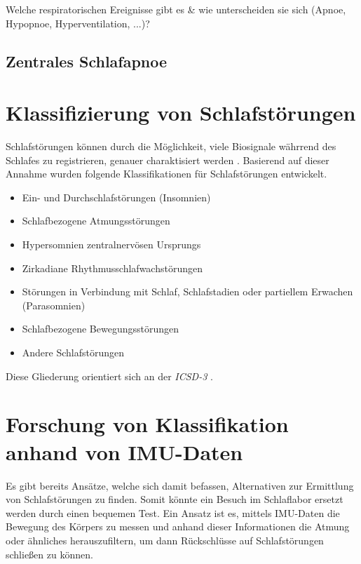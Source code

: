 Welche respiratorischen Ereignisse gibt es \& wie unterscheiden sie sich (Apnoe, Hypopnoe, Hyperventilation, ...)?

\subsection{Zentrales Schlafapnoe}


\section{Klassifizierung von Schlafstörungen}
Schlafstörungen können durch die Möglichkeit, viele Biosignale währrend des Schlafes zu registrieren, genauer charaktisiert werden \cite{praxis_der_schlafmedizin}.
Basierend auf dieser Annahme wurden folgende Klassifikationen für Schlafstörungen entwickelt.
\begin{itemize}
    \item Ein- und Durchschlafstörungen (Insomnien)
    \item Schlafbezogene Atmungsstörungen
    \item Hypersomnien zentralnervösen Ursprungs
    \item Zirkadiane Rhythmusschlafwachstörungen
    \item Störungen in Verbindung mit Schlaf, Schlafstadien oder partiellem Erwachen (Parasomnien)
    \item Schlafbezogene Bewegungsstörungen
    \item Andere Schlafstörungen
\end{itemize}

Diese Gliederung orientiert sich an der \textit{ICSD-3} \cite{praxis_der_schlafmedizin}.


\section{Forschung von Klassifikation anhand von IMU-Daten}
Es gibt bereits Ansätze, welche sich damit befassen, Alternativen zur Ermittlung von Schlafstörungen zu finden. 
Somit könnte ein Besuch im Schlaflabor ersetzt werden durch einen bequemen Test.
Ein Ansatz ist es, mittels IMU-Daten die Bewegung des Körpers zu messen und anhand dieser Informationen die Atmung oder ähnliches herauszufiltern, um dann Rückschlüsse auf Schlafstörungen schließen zu können.

